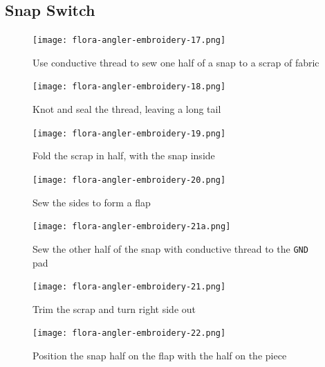 \documentclass[letterpaper,twoside,12pt]{article}
\begin{document}
\subsection{Snap Switch}
\begin{figure}[hbpt]\begin{centering}%
\texttt{[image: flora-angler-embroidery-17.png]}
\caption{Use conductive thread to sew one half of a snap to a scrap of fabric}
\label{fig:flora-angler-embroidery-17}
\end{centering}\end{figure}
\begin{figure}[hbpt]\begin{centering}%
\texttt{[image: flora-angler-embroidery-18.png]}
\caption{Knot and seal the thread, leaving a long tail}
\label{fig:flora-angler-embroidery-18}
\end{centering}\end{figure}
\begin{figure}[hbpt]\begin{centering}%
\texttt{[image: flora-angler-embroidery-19.png]}
\caption{Fold the scrap in half, with the snap inside}
\label{fig:flora-angler-embroidery-19}
\end{centering}\end{figure}
\begin{figure}[hbpt]\begin{centering}%
\texttt{[image: flora-angler-embroidery-20.png]}
\caption{Sew the sides to form a flap}
\label{fig:flora-angler-embroidery-20}
\end{centering}\end{figure}
\begin{figure}[hbpt]\begin{centering}%
\texttt{[image: flora-angler-embroidery-21a.png]}
\caption{Sew the other half of the snap with conductive thread to the 
\texttt{GND} pad}
\label{fig:flora-angler-embroidery-21a}
\end{centering}\end{figure}
\begin{figure}[hbpt]\begin{centering}%
\texttt{[image: flora-angler-embroidery-21.png]}
\caption{Trim the scrap and turn right side out}
\label{fig:flora-angler-embroidery-21}
\end{centering}\end{figure}
\begin{figure}[hbpt]\begin{centering}%
\texttt{[image: flora-angler-embroidery-22.png]}
\caption{Position the snap half on the flap with the half on the piece}
\label{fig:flora-angler-embroidery-22}
\end{centering}\end{figure}
\end{document}

